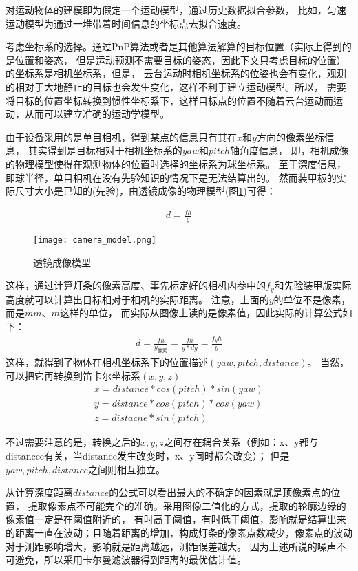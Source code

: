 对运动物体的建模即为假定一个运动模型，通过历史数据拟合参数，
比如，匀速运动模型为通过一堆带着时间信息的坐标点去拟合速度。\par

考虑坐标系的选择。通过PnP\cite{wu2006pnp}算法或者是其他算法解算的目标位置（实际上得到的是位置和姿态，
但是运动预测不需要目标的姿态，因此下文只考虑目标的位置）的坐标系是相机坐标系，但是，
云台运动时相机坐标系的位姿也会有变化，观测的相对于大地静止的目标也会发生变化，这样不利于建立运动模型。所以，
需要将目标的位置坐标转换到惯性坐标系下，这样目标点的位置不随着云台运动而运动，从而可以建立准确的运动学模型。\par
由于设备采用的是单目相机，得到某点的信息只有其在$x$和$y$方向的像素坐标信息，
其实得到是目标相对于相机坐标系的$yaw$和$pitch$轴角度信息，
即，相机成像的物理模型使得在观测物体的位置时选择的坐标系为球坐标系。
至于深度信息，即球半径，单目相机在没有先验知识的情况下是无法结算出的。
然而装甲板的实际尺寸大小是已知的(先验)，由透镜成像的物理模型(图\ref{透镜成像模型})可得：\par
\begin{gather}
    d = \frac{fh}{y} 
\end{gather}

\begin{figure}[H]
    \centering
    \texttt{[image: camera\_model.png]} 
    \caption{透镜成像模型}
    \label{透镜成像模型} 
\end{figure}    
这样，通过计算灯条的像素高度、事先标定好的相机内参中的$f_y$和先验装甲版实际高度就可以计算出目标相对于相机的实际距离。
注意，上面的$y$的单位不是像素，而是$mm$、$m$这样的单位，
而实际从图像上读的是像素值，因此实际的计算公式如下：
\begin{gather}
    d=\frac{fh}{y_{像素}}=\frac{fh}{y*dy}=\frac{f_yh}{y}
\end{gather}
这样，就得到了物体在相机坐标系下的位置描述$(yaw,pitch, distance)$。
当然，可以把它再转换到笛卡尔坐标系$(x,y,z)$
\begin{gather}
    x = distance*cos(pitch)*sin(yaw) \\
    y = distance*cos(pitch)*cos(yaw) \\
    z = distacne * sin(pitch)
\end{gather} \par
不过需要注意的是，转换之后的$x,y,z$之间存在耦合关系（例如：x、y都与distancce有关，当distance发生改变时，x、y同时都会改变）；
但是$yaw,pitch,distance$之间则相互独立。\par

从计算深度距离$distance$的公式可以看出最大的不确定的因素就是顶像素点的位置，
提取像素点不可能完全的准确。采用图像二值化的方式，提取的轮廓边缘的像素值一定是在阈值附近的，
有时高于阈值，有时低于阈值，影响就是结算出来的距离一直在波动；且随着距离的增加，构成灯条的像素点数减少，像素点的波动对于测距影响增大，影响就是距离越远，测距误差越大。
因为上述所说的噪声不可避免，所以采用卡尔曼滤波器得到距离的最优估计值。\par


